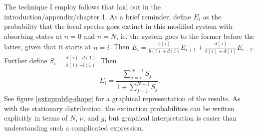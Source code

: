 The technique I employ follows that laid out in the introduction/appendix/chapter 1. %
As a brief reminder, define $E_i$ as the probability that the focal species goes extinct in this modified system with absorbing states at $n=0$ and $n=N$, ie. the system goes to the former before the latter, given that it starts at $n=i$. 
Then $E_i = \frac{b(i)}{b(i)+d(i)}E_{i+1} + \frac{d(i)}{b(i)+d(i)}E_{i-1}$. 
Further define $S_i = \frac{d(i)\cdots d(1)}{b(i)\cdots b(1)}$. 
Then 
\begin{equation} \label{extnprob}
E_{i} = \frac{\sum_{j=i}^{N-1}S_j}{1+\sum_{j=1}^{N-1}S_j}. 
\end{equation}
See figure \ref{extnprobfig-ihope} for a graphical representation of the results. 
As with the stationary distribution, the extinction probabilities can be written explicitly in terms of $N$, $\nu$, and $g$, but graphical interpretation is easier than understanding such a complicated expression. %
